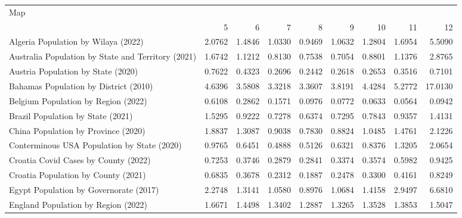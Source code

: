 \begin{tabular}{lrrrrrrrr}
\toprule
Map &  \\
\cmidrule(lr){2-9}
     & 5 & 6 & 7 & 8 & 9 & 10 & 11 & 12 \\
\midrule

                      Algeria Population by Wilaya (2022) &   2.0762 &  1.4846 &  1.0330 &  0.9469 &  1.0632 &  1.2804 &  1.6954 &   5.5090 \\
       Australia Population by State and Territory (2021) &   1.6742 &  1.1212 &  0.8130 &  0.7538 &  0.7054 &  0.8801 &  1.1376 &   2.8765 \\
                       Austria Population by State (2020) &   0.7622 &  0.4323 &  0.2696 &  0.2442 &  0.2618 &  0.2653 &  0.3516 &   0.7101 \\
                    Bahamas Population by District (2010) &   4.6396 &  3.5808 &  3.3218 &  3.3607 &  3.8191 &  4.4284 &  5.2772 &  17.0130 \\
                      Belgium Population by Region (2022) &   0.6108 &  0.2862 &  0.1571 &  0.0976 &  0.0772 &  0.0633 &  0.0564 &   0.0942 \\
                        Brazil Population by State (2021) &   1.5295 &  0.9222 &  0.7278 &  0.6374 &  0.7295 &  0.7843 &  0.9357 &   1.4131 \\
                      China Population by Province (2020) &   1.8837 &  1.3087 &  0.9038 &  0.7830 &  0.8824 &  1.0485 &  1.4761 &   2.1226 \\
              Conterminous USA Population by State (2020) &   0.9765 &  0.6451 &  0.4888 &  0.5126 &  0.6321 &  0.8376 &  1.3205 &   2.0654 \\
                     Croatia Covid Cases by County (2022) &   0.7253 &  0.3746 &  0.2879 &  0.2841 &  0.3374 &  0.3574 &  0.5982 &   0.9425 \\
                      Croatia Population by County (2021) &   0.6835 &  0.3678 &  0.2312 &  0.1887 &  0.2478 &  0.3300 &  0.4161 &   0.8249 \\
                   Egypt Population by Governorate (2017) &   2.2748 &  1.3141 &  1.0580 &  0.8976 &  1.0684 &  1.4158 &  2.9497 &   6.6810 \\
                      England Population by Region (2022) &   1.6671 &  1.4498 &  1.3402 &  1.2887 &  1.3265 &  1.3528 &  1.3853 &   1.5047 \\

\end{tabular}
